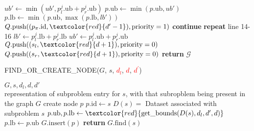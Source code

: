 \begin{algorithm}[H]
\begin{algorithmic}[1]
        \STATE $ub' \gets \min(ub', p_l^j.\text{ub} + p_r^j.\text{ub})$
    \ENDFOR
        \STATE $p.\text{ub} \gets \min(p.\text{ub}, ub')$
        \STATE $p.\text{lb} \gets \min(p.\text{ub}, \max(p.\text{lb}, lb'))$
            \STATE $Q.\text{push}((p_\pi.\text{id}, \textcolor{red}{d^\prime-1}), \text{priority} = 1)$
        \ENDFOR
    \ENDIF
        \STATE \textbf{continue} \COMMENT{\textcolor{commentgreen}{ problem solved just now}}
    \ENDIF
    \IF {\textcolor{red}{$d^\prime < d_l$}}
        \STATE \textbf{repeat} line 14-16 \COMMENT{\textcolor{commentgreen}{ fetch $p_l^j$ and $p_r^j$ in case of update}}
        \STATE $lb' \gets p_l^j.\text{lb} + p_r^j.\text{lb}$
        \STATE $ub' \gets p_l^j.\text{ub} + p_r^j.\text{ub}$
            \STATE $Q.\text{push}((s_l, \textcolor{red}{d+1}), \text{priority} = 0)$
            \STATE $Q.\text{push}((s_r, \textcolor{red}{d+1}), \text{priority} = 0)$
        \ENDIF
    \ENDFOR
    \ENDIF 
\ENDWHILE
\STATE \textbf{return} $\mathcal{G}$
\end{algorithmic}
\end{algorithm}
\begin{algorithm}[H]
\caption{FIND\_OR\_CREATE\_NODE($G$, $s$, \textcolor{red}{$d_l$}, \textcolor{red}{$d$}, \textcolor{red}{$d^\prime$})}
\begin{algorithmic}[1]
\REQUIRE $G, s, d_l, d, d'$ \COMMENT{\textcolor{commentgreen}{Graph, subproblem, lookahead depth, overall depth budget, current depth}}\\
\RETURN representation of subproblem entry for $s$, with that subropblem being present in the graph $G$
    \STATE create node $p$
    \STATE $p.\text{id} \gets s$ 
    \COMMENT{\textcolor{commentgreen}{ identify $p$ by $s$}}
    \STATE $D(s) = $ Dataset associated with subproblem $s$
    \STATE $p.\text{ub}, p.\text{lb} \gets \textcolor{red}{\text{get\_bounds}(D(s),d_l,d^\prime, d)}$
        \STATE $p.\text{lb} \gets p.\text{ub}$ \COMMENT{\textcolor{commentgreen}{ no more splitting needed}}
    \ENDIF
    \STATE $G.\text{insert}(p)$ \COMMENT{\textcolor{commentgreen}{ put $p$ in dependency graph}}
\ENDIF
\STATE \textbf{return} $G.\text{find}(s)$
\end{algorithmic}
\end{algorithm}
